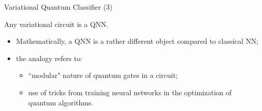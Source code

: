 \begin{frame}{Variational Quantum Classifier (3)}

Any variational circuit is a QNN. 
\begin{itemize}
    \item Mathematically, a QNN is a rather different object compared to classical NN;
    \item the analogy refers to:
    \begin{itemize}
        \item ``modular" nature of quantum gates in a circuit;
        \item use of tricks from training neural networks in the optimization of quantum algorithms.
    \end{itemize}
\end{itemize}

\begin{center}
\end{center}

\end{frame}


%
%



